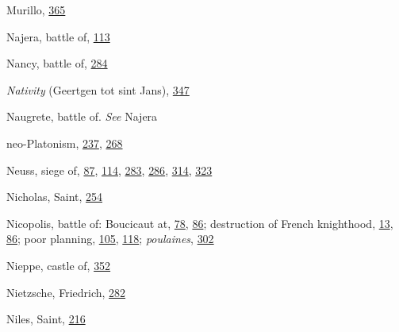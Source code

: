 Murillo,
\protect\hyperlink{21_Chapter_Thirteen__IMAGE_AND_WORD.xhtmlux5cux23page_365}{365}

Najera, battle of,
\protect\hyperlink{10_Chapter_Three__THE_HEROIC_DREAM.xhtmlux5cux23page_113}{113}

Nancy, battle of,
\protect\hyperlink{18_Chapter_Eleven__THE_FORMS_OF_THO.xhtmlux5cux23page_284}{284}

\emph{Nativity} (Geertgen tot sint Jans),
\protect\hyperlink{21_Chapter_Thirteen__IMAGE_AND_WORD.xhtmlux5cux23page_347}{347}

Naugrete, battle of. \emph{See} Najera

neo-Platonism,
\protect\hyperlink{16_Chapter_Nine__THE_DECLINE_OF_SYM.xhtmlux5cux23page_237}{237},
\protect\hyperlink{18_Chapter_Eleven__THE_FORMS_OF_THO.xhtmlux5cux23page_268}{268}

Neuss, siege of,
\protect\hyperlink{10_Chapter_Three__THE_HEROIC_DREAM.xhtmlux5cux23page_87}{87},
\protect\hyperlink{10_Chapter_Three__THE_HEROIC_DREAM.xhtmlux5cux23page_114}{114},
\protect\hyperlink{18_Chapter_Eleven__THE_FORMS_OF_THO.xhtmlux5cux23page_283}{283},
\protect\hyperlink{18_Chapter_Eleven__THE_FORMS_OF_THO.xhtmlux5cux23page_286}{286},
\protect\hyperlink{20_ILLUSTRATIONS_FOLLOW_PAGE.xhtmlux5cux23page_314}{314},
\protect\hyperlink{20_ILLUSTRATIONS_FOLLOW_PAGE.xhtmlux5cux23page_323}{323}

Nicholas, Saint,
\protect\hyperlink{17_Chapter_Ten__THE_FAILURE_OF_IMAG.xhtmlux5cux23page_254}{254}

Nicopolis, battle of: Boucicaut at,
\protect\hyperlink{10_Chapter_Three__THE_HEROIC_DREAM.xhtmlux5cux23page_78}{78},
\protect\hyperlink{10_Chapter_Three__THE_HEROIC_DREAM.xhtmlux5cux23page_86}{86};
destruction of French knighthood,
\protect\hyperlink{08_Chapter_One__THE_PASSIONATE_INTE.xhtmlux5cux23page_13}{13},
\protect\hyperlink{10_Chapter_Three__THE_HEROIC_DREAM.xhtmlux5cux23page_86}{86};
poor planning,
\protect\hyperlink{10_Chapter_Three__THE_HEROIC_DREAM.xhtmlux5cux23page_105}{105},
\protect\hyperlink{10_Chapter_Three__THE_HEROIC_DREAM.xhtmlux5cux23page_118}{118};
\emph{poulaines},
\protect\hyperlink{20_ILLUSTRATIONS_FOLLOW_PAGE.xhtmlux5cux23page_302}{302}

Nieppe, castle of,
\protect\hyperlink{21_Chapter_Thirteen__IMAGE_AND_WORD.xhtmlux5cux23page_352}{352}

Nietzsche, Friedrich,
\protect\hyperlink{18_Chapter_Eleven__THE_FORMS_OF_THO.xhtmlux5cux23page_282}{282}

Niles, Saint,
\protect\hyperlink{14_Chapter_Seven__THE_PIOUS_PERSONA.xhtmlux5cux23page_216}{216}


